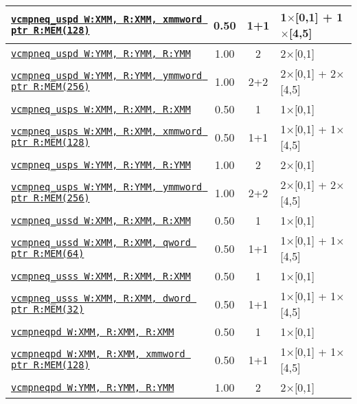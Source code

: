 \documentclass[a4paper,english,fontsize=9]{scrartcl}
\begin{document}
\begin{longtable}{p{}ccL{.25\textwidth}}
  \midrule
  \texttt{\href{https://felixcloutier.com/x86/CMPPD.html}{vcmpneq\_uspd W:XMM, R:XMM, xmmword ptr R:MEM(128)}} & 0.50 & 1+1 & 1\(\times\)[0,1] + 1\(\times\)[4,5] \\
  \midrule
  \texttt{\href{https://felixcloutier.com/x86/CMPPD.html}{vcmpneq\_uspd W:YMM, R:YMM, R:YMM}} & 1.00 & 2 & 2\(\times\)[0,1] \\
  \midrule
  \texttt{\href{https://felixcloutier.com/x86/CMPPD.html}{vcmpneq\_uspd W:YMM, R:YMM, ymmword ptr R:MEM(256)}} & 1.00 & 2+2 & 2\(\times\)[0,1] + 2\(\times\)[4,5] \\
  \midrule
  \texttt{\href{https://felixcloutier.com/x86/CMPPS.html}{vcmpneq\_usps W:XMM, R:XMM, R:XMM}} & 0.50 & 1 & 1\(\times\)[0,1] \\
  \midrule
  \texttt{\href{https://felixcloutier.com/x86/CMPPS.html}{vcmpneq\_usps W:XMM, R:XMM, xmmword ptr R:MEM(128)}} & 0.50 & 1+1 & 1\(\times\)[0,1] + 1\(\times\)[4,5] \\
  \midrule
  \texttt{\href{https://felixcloutier.com/x86/CMPPS.html}{vcmpneq\_usps W:YMM, R:YMM, R:YMM}} & 1.00 & 2 & 2\(\times\)[0,1] \\
  \midrule
  \texttt{\href{https://felixcloutier.com/x86/CMPPS.html}{vcmpneq\_usps W:YMM, R:YMM, ymmword ptr R:MEM(256)}} & 1.00 & 2+2 & 2\(\times\)[0,1] + 2\(\times\)[4,5] \\
  \midrule
  \texttt{\href{https://felixcloutier.com/x86/CMPSD.html}{vcmpneq\_ussd W:XMM, R:XMM, R:XMM}} & 0.50 & 1 & 1\(\times\)[0,1] \\
  \midrule
  \texttt{\href{https://felixcloutier.com/x86/CMPSD.html}{vcmpneq\_ussd W:XMM, R:XMM, qword ptr R:MEM(64)}} & 0.50 & 1+1 & 1\(\times\)[0,1] + 1\(\times\)[4,5] \\
  \midrule
  \texttt{\href{https://felixcloutier.com/x86/CMPSS.html}{vcmpneq\_usss W:XMM, R:XMM, R:XMM}} & 0.50 & 1 & 1\(\times\)[0,1] \\
  \midrule
  \texttt{\href{https://felixcloutier.com/x86/CMPSS.html}{vcmpneq\_usss W:XMM, R:XMM, dword ptr R:MEM(32)}} & 0.50 & 1+1 & 1\(\times\)[0,1] + 1\(\times\)[4,5] \\
  \midrule
  \texttt{\href{https://felixcloutier.com/x86/CMPPD.html}{vcmpneqpd W:XMM, R:XMM, R:XMM}} & 0.50 & 1 & 1\(\times\)[0,1] \\
  \midrule
  \texttt{\href{https://felixcloutier.com/x86/CMPPD.html}{vcmpneqpd W:XMM, R:XMM, xmmword ptr R:MEM(128)}} & 0.50 & 1+1 & 1\(\times\)[0,1] + 1\(\times\)[4,5] \\
  \midrule
  \texttt{\href{https://felixcloutier.com/x86/CMPPD.html}{vcmpneqpd W:YMM, R:YMM, R:YMM}} & 1.00 & 2 & 2\(\times\)[0,1] \\

\end{longtable}
\end{document}
